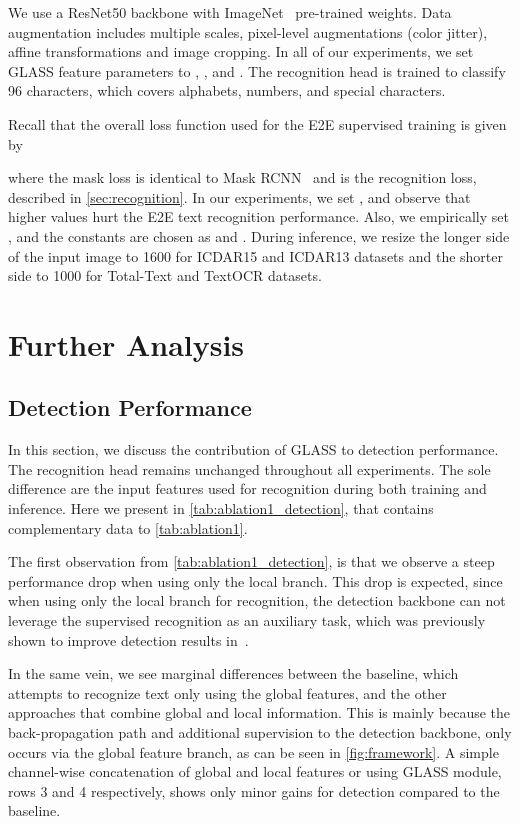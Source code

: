 \documentclass[runningheads]{llncs}
\begin{document}
We use a ResNet50 backbone with ImageNet~\cite{russakovsky2015imagenet} pre-trained weights.
Data augmentation includes multiple scales, pixel-level augmentations (color jitter), affine transformations and image cropping. 
In all of our experiments, we set GLASS feature parameters  to , ,  and .
The recognition head is trained to classify 96 characters, which covers alphabets, numbers, and special characters. 

Recall that the overall loss function  used for the E2E supervised training is given by

where the mask loss  is identical to Mask RCNN~\cite{he2017mask} and  is the recognition loss, described in \cref{sec:recognition}.
In our experiments, we set , and observe that higher values hurt the E2E text recognition performance.
Also, we empirically set , and the  constants are chosen as  and .
During inference, we resize the longer side of the input image to 1600 for ICDAR15 and ICDAR13 datasets and the shorter side to 1000 for Total-Text and TextOCR datasets.


\section{Further Analysis}
\label{sec:further}

\subsection{Detection Performance}

In this section, we discuss the contribution of GLASS to detection performance.
The recognition head remains unchanged throughout all experiments.
The sole difference are the input features used for recognition during both training and inference.
Here we present in \cref{tab:ablation1_detection}, that contains complementary data to \cref{tab:ablation1}. 

The first observation from \cref{tab:ablation1_detection}, is that we observe a steep performance drop when using only the local branch.
This drop is expected, since when using only the local branch for recognition, the detection backbone can not leverage the supervised recognition as an auxiliary task, which was previously shown to improve detection results in~\cite{qin2019towards,wang2021towards}.

In the same vein, we see marginal differences between the baseline, which attempts to recognize text only using the global features, and the other approaches that combine global and local information.
This is mainly because the back-propagation path and additional supervision to the detection backbone, only occurs via the global feature branch, as can be seen in \cref{fig:framework}.
A simple channel-wise concatenation of global and local features or using GLASS module, rows 3 and 4 respectively, shows only minor gains for detection compared to the baseline.
\end{document}
